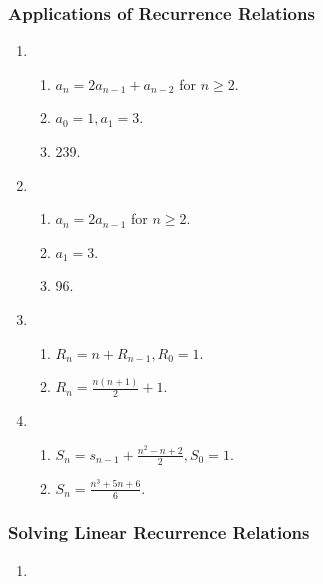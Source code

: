 \documentclass{../../cls/sig-alternate-05-2015}
\begin{document}
\subsubsection{Applications of Recurrence Relations}
\begin{enumerate}
\item \begin{enumerate}
    \item $a_n  = 2 a_{n - 1} + a_{n - 2}$ for $n \ge 2$.
    \item $a_0 = 1, a_1 = 3$.
    \item 239.
\end{enumerate}

\item \begin{enumerate}
    \item $a_n  = 2 a_{n - 1}$ for $n \ge 2$.
    \item $a_1 = 3$.
    \item 96.
\end{enumerate}

\item \begin{enumerate}
    \item $R_n = n + R_{n - 1}, R_0 = 1$.
    \item $R_n = \frac{n(n + 1)}{2} + 1$.
\end{enumerate}

\item \begin{enumerate}
    \item $S_n = s_{n - 1} + \frac{n^2 - n + 2}{2}, S_0 = 1$.
    \item $S_n = \frac{n^3 + 5n + 6}{6}$.
\end{enumerate}

\end{enumerate}

\subsubsection{Solving Linear Recurrence Relations}
\begin{enumerate}
\item 
\end{enumerate}
\end{document}
